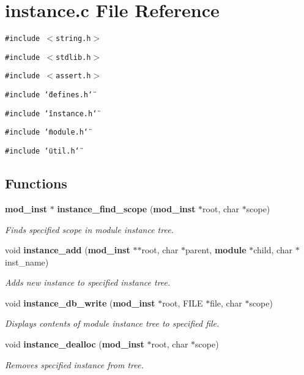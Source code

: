 \section{instance.c File Reference}
\label{instance_8c}
{\tt \#include $<$string.h$>$}\par
{\tt \#include $<$stdlib.h$>$}\par
{\tt \#include $<$assert.h$>$}\par
{\tt \#include \char`\"{}defines.h\char`\"{}}\par
{\tt \#include \char`\"{}instance.h\char`\"{}}\par
{\tt \#include \char`\"{}module.h\char`\"{}}\par
{\tt \#include \char`\"{}util.h\char`\"{}}\par
\subsection*{Functions}
\begin{CompactItemize}
\item 
{\bf mod\_\-inst} $\ast$ {\bf instance\_\-find\_\-scope} ({\bf mod\_\-inst} $\ast$root, char $\ast$scope)
\begin{CompactList}\small\item\em Finds specified scope in module instance tree.\item\end{CompactList}\item 
void {\bf instance\_\-add} ({\bf mod\_\-inst} $\ast$$\ast$root, char $\ast$parent, {\bf module} $\ast$child, char $\ast$inst\_\-name)
\begin{CompactList}\small\item\em Adds new instance to specified instance tree.\item\end{CompactList}\item 
void {\bf instance\_\-db\_\-write} ({\bf mod\_\-inst} $\ast$root, FILE $\ast$file, char $\ast$scope)
\begin{CompactList}\small\item\em Displays contents of module instance tree to specified file.\item\end{CompactList}\item 
void {\bf instance\_\-dealloc} ({\bf mod\_\-inst} $\ast$root, char $\ast$scope)
\begin{CompactList}\small\item\em Removes specified instance from tree.\item\end{CompactList}\end{CompactItemize}


